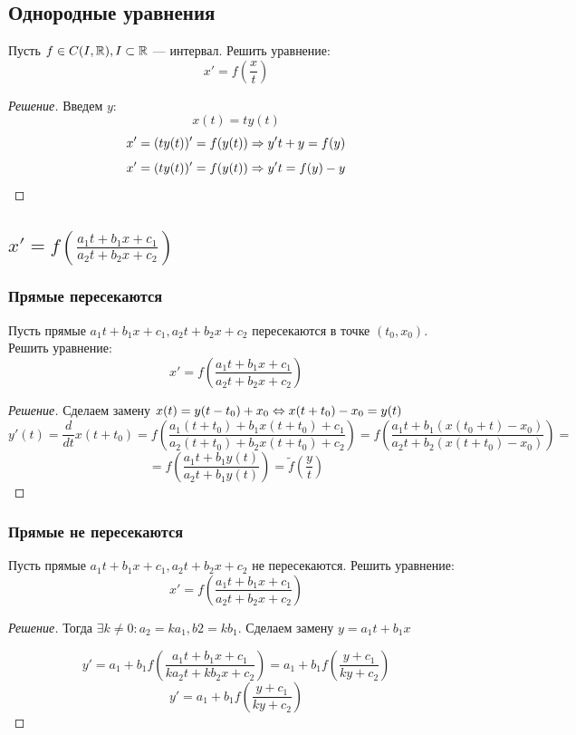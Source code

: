 

\subsection{Однородные уравнения}
\begin{problem}
    Пусть \(f \in C(I, \mathbb{R}), I \subset \mathbb{R}\) --- интервал. Решить уравнение:
    \[x' = f\left(\frac{x}{t}\right)\]
\end{problem}
\begin{proof}[Решение]
    Введем \(y\): \[x(t) = ty(t)\]
    \[x' = (ty(t))' = f(y(t)) \Rightarrow y't + y = f(y)\]
    \[x' = (ty(t))' = f(y(t)) \Rightarrow y't = f(y) - y\]
\end{proof}

\subsection{\(x' = f\left(\frac{a_1t + b_1x + c_1}{a_2t + b_2x + c_2}\right)\)}
\subsubsection{Прямые пересекаются}
\begin{problem}
    Пусть прямые \(a_1t + b_1x + c_1, a_2t + b_2x + c_2\) пересекаются в точке \((t_0, x_0)\). Решить уравнение:
    \[x' = f\left(\frac{a_1t + b_1x + c_1}{a_2t + b_2x + c_2}\right)\]
\end{problem}
\begin{proof}[Решение]
    Сделаем замену \(x(t) = y(t - t_0) + x_0 \Leftrightarrow x(t + t_0) - x_0 = y(t)\)
    \[y'(t) = \frac{d}{dt}x(t + t_0) = f\left(\frac{a_1(t + t_0) + b_1x(t + t_0) + c_1}{a_2(t + t_0) + b_2x(t + t_0) + c_2}\right) = f\left(\frac{a_1t + b_1(x(t_0 + t) - x_0)}{a_2t + b_2(x(t + t_0) - x_0)}\right)=\]
    \[ = f\left(\frac{a_1t + b_1y(t)}{a_2t + b_1y(t)}\right) = \tilde{f}\left(\frac{y}{t}\right)\]
\end{proof}

\subsubsection{Прямые не пересекаются}
\begin{problem}
    Пусть прямые \(a_1t + b_1x + c_1, a_2t + b_2x + c_2\) не пересекаются. Решить уравнение:
    \[x' = f\left(\frac{a_1t + b_1x + c_1}{a_2t + b_2x + c_2}\right)\]
\end{problem}
\begin{proof}[Решение]
    Тогда \(\exists k \ne 0: a_2 = ka_1, b2 = kb_1\). Сделаем замену \(y = a_1t + b_1x\)

    \[y' = a_1 + b_1f\left(\frac{a_1t + b_1x + c_1}{ka_2t + kb_2x + c_2}\right) = a_1 + b_1f\left(\frac{y + c_1}{ky + c_2}\right)\]
    \[y' = a_1 + b_1f\left(\frac{y + c_1}{ky + c_2}\right)\]
\end{proof}

